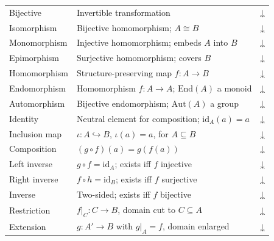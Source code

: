 \begin{tcolorbox}[colback=gray!6, colframe=gray!40, arc=2pt,
  left=6pt, right=6pt, top=4pt, bottom=4pt,
  title={\small\textbf{Functions — Algebraic Quick Reference}},
  fonttitle=\small\bfseries]
\begin{tabular}{l l l}
Bijective         & Invertible transformation                             & \hyperref[def:alg-bijective]{↓} \\
Isomorphism       & Bijective homomorphism; $A \cong B$                   & \hyperref[def:isomorphism]{↓} \\
Monomorphism      & Injective homomorphism; embeds $A$ into $B$           & \hyperref[def:monomorphism]{↓} \\
Epimorphism       & Surjective homomorphism; covers $B$                   & \hyperref[def:epimorphism]{↓} \\
Homomorphism      & Structure-preserving map $f : A \to B$                & \hyperref[def:homomorphism]{↓} \\
Endomorphism      & Homomorphism $f : A \to A$; $\mathrm{End}(A)$ a monoid & \hyperref[def:endomorphism]{↓} \\
Automorphism      & Bijective endomorphism; $\mathrm{Aut}(A)$ a group     & \hyperref[def:automorphism]{↓} \\
Identity          & Neutral element for composition; $\mathrm{id}_A(a)=a$ & \hyperref[def:alg-identity]{↓} \\
Inclusion map     & $\iota : A \hookrightarrow B$, $\iota(a)=a$, for $A \subseteq B$ & \hyperref[def:alg-inclusion]{↓} \\
Composition       & $(g \circ f)(a) = g(f(a))$                           & \hyperref[def:alg-composition]{↓} \\
Left inverse      & $g \circ f = \mathrm{id}_A$; exists iff $f$ injective  & \hyperref[def:alg-left-inverse]{↓} \\
Right inverse     & $f \circ h = \mathrm{id}_B$; exists iff $f$ surjective & \hyperref[def:alg-left-inverse]{↓} \\
Inverse           & Two-sided; exists iff $f$ bijective                  & \hyperref[def:alg-inverse]{↓} \\
Restriction       & $f|_C : C \to B$, domain cut to $C \subseteq A$      & \hyperref[def:alg-restriction]{↓} \\
Extension         & $g : A' \to B$ with $g|_A = f$, domain enlarged      & \hyperref[def:alg-restriction]{↓} \\
\bottomrule
\end{tabular}
\end{tcolorbox}

\vspace{1em}


